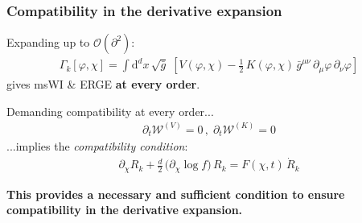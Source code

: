 \documentclass[]{beamer}  %
\begin{document}
\begin{frame}
  \frametitle{Compatibility in the derivative expansion}

  Expanding up to $\mathcal{O}(\partial^2)$:
  \begin{align*}
    \boxed{
      \Gamma_k[\varphi, \chi] = \int \mathrm d^dx \, \sqrt{\bar g} \;
      \left[
        V(\varphi,\chi)
        - \frac{1}{2} \, K(\varphi,\chi) \,
        \bar g^{\mu\nu}\, \partial_{\mu} \varphi  \,
        \partial_{\nu}\varphi
      \right]
    }
  \end{align*}
  gives msWI \& ERGE \textbf{at every order}.
  \vspace{25pt}

  Demanding compatibility at every order...
  \begin{align*}
    \partial_t \mathcal{W}^{(V)} = 0 \,, \; \partial_t \mathcal{W}^{(K)} = 0
  \end{align*}
  ...implies the \textit{compatibility condition}:
  \begin{align*}
    \boxed{
      \partial_\chi R_k + \frac{d}{2} \, \big( \partial_\chi \log f \big) \, R_k = F(\chi,t) \,\dot R_k
    }
  \end{align*}

  \begin{center}
    \textbf{
      This provides a necessary and sufficient condition to ensure\\
      compatibility in the derivative expansion.
    }
  \end{center}
\end{frame}


\end{document}

